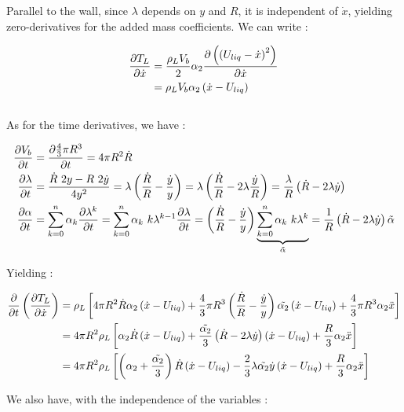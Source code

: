 Parallel to the wall, since $\lambda$ depends on $y$ and $R$, it is independent of $\dot{x}$, yielding zero-derivatives for the added mass coefficients. We can write :

\begin{align}
\frac{\partial T_{L}}{\partial \dot{x}}&=\frac{\rho_{L}V_{b}}{2}\alpha_{2} \frac{\partial \left(  \left( U_{liq}-\dot{x} \right)^{2} \right) }{\partial \dot{x}}\\
&= \rho_{L}V_{b}\alpha_{2}\left( \dot{x}-U_{liq} \right)\\
\end{align}\\

As for the time derivatives, we have : 

\begin{align}
\frac{\partial V_{b}}{\partial t}&=\frac{\partial \frac{4}{3}\pi R^{3}}{\partial t} = 4\pi R^{2} \dot{R}\\
\frac{\partial \lambda}{\partial t}&=\frac{\dot{R}~2y-R~2\dot{y}}{4y^{2}}=\lambda\left(  \frac{\dot{R}}{R} - \frac{\dot{y}}{y}   \right)=\lambda \left( \frac{\dot{R}}{R}-2\lambda \frac{\dot{y}}{R} \right)=\frac{\lambda}{R}\left( \dot{R}-2\lambda \dot{y} \right)\\
\frac{\partial \alpha}{\partial t}&=\sum_{k=0}^{n}\alpha_{k}\frac{\partial \lambda ^{k}}{\partial t} = \sum_{k=0}^{n}\alpha_{k}~k\lambda ^{k-1} \frac{\partial \lambda}{\partial t} = \left(  \frac{\dot{R}}{R} - \frac{\dot{y}}{y}   \right)\underbrace{ \sum_{k=0}^{n}\alpha_{k}~k\lambda^{k} }_{\tilde{\alpha}} = \frac{1}{R}\left( \dot{R}-2\lambda \dot{y} \right)\tilde{\alpha}
\end{align}

Yielding : 

\begin{align}
\frac{\partial }{\partial t}\left(  \frac{\partial T_{L}}{\partial \dot{x}} \right)&=\rho_{L}\left[  4\pi R^{2} \dot{R} \alpha_{2}\left( \dot{x}-U_{liq} \right)+\frac{4}{3}\pi R^{3}\left(  \frac{\dot{R}}{R} - \frac{\dot{y}}{y}  \right)\tilde{\alpha_{2}}\left( \dot{x}-U_{liq} \right)+\frac{4}{3}\pi R^{3}\alpha_{2} \ddot{x}  \right] \\
&=4\pi R^{2} \rho_{L}\left[  \alpha_{2}\dot{R}\left( \dot{x}-U_{liq} \right)+\frac{\tilde{\alpha_{2}}}{3}\left( \dot{R}- 2\lambda \dot{y}  \right)\left( \dot{x}-U_{liq} \right) + \frac{R}{3}\alpha_{2}\ddot{x}  \right]\\
&=4 \pi R^{2} \rho_{L}\left[ \left( \alpha_{2}+\frac{\tilde{\alpha_{2}}}{3} \right)\dot{R}\left( \dot{x}-U_{liq} \right)-\frac{2}{3}\lambda \tilde{\alpha_{2}}\dot{y}\left( \dot{x}-U_{liq} \right)+\frac{R}{3}\alpha_{2}\ddot{x}  \right]
\end{align}

We also have, with the independence of the variables :

